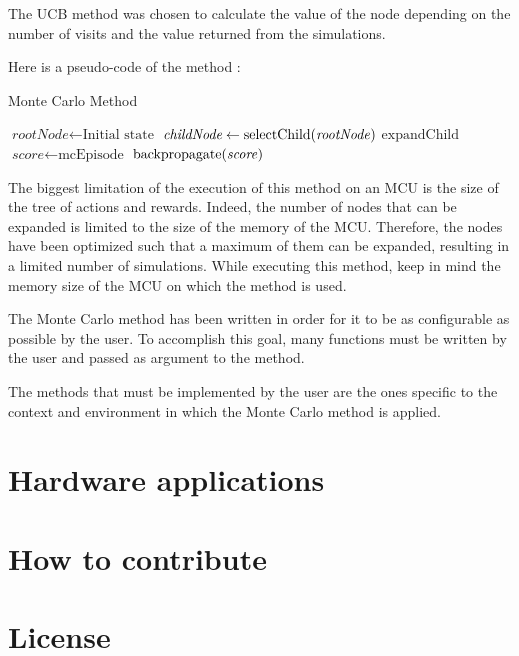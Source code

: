 \documentclass{book}
\begin{document}
The UCB method was chosen to calculate the value of the node depending on the number of visits and the value returned from the simulations.

Here is a pseudo-code of the method :

\begin{algorithm}
  \caption{Monte Carlo Method}
  \begin{algorithmic}[1]
    \State $\textit{rootNode} \gets \text{Initial state}$
   
    \State $\textit{childNode} \gets \text{selectChild(\textit{rootNode})}$
    \State $\text{expandChild}$
    \State $\textit{score} \gets\text{mcEpisode}$
    \State $\text{backpropagate(\textit{score})}$
  \EndWhile
  \end{algorithmic}
\end{algorithm}

The biggest limitation of the execution of this method on an MCU is the size of the tree of actions and rewards. Indeed, the number of nodes that can be expanded is limited to the size of the memory of the MCU. Therefore, the nodes have been optimized such that a maximum of them can be expanded, resulting in a limited number of simulations. While executing this method, keep in mind the memory size of the MCU on which the method is used. 

The Monte Carlo method has been written in order for it to be as configurable as possible by the user. To accomplish this goal, many functions must be written by the user and passed as argument to the method. 

The methods that must be implemented by the user are the ones specific to the context and environment in which the Monte Carlo method is applied.

\chapter{Hardware applications}


\chapter{How to contribute}

\chapter{License}
\end{document}
